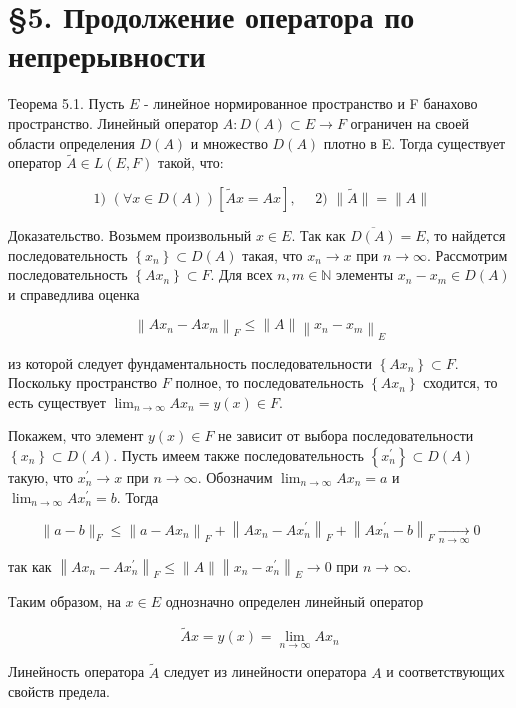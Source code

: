 \section*{§5. Продолжение оператора по непрерывности}
Теорема 5.1. Пусть $E$ - линейное нормированное пространство и F банахово пространство. Линейный оператор $A: D(A) \subset E \rightarrow F$ ограничен на своей области определения $D(A)$ и множество $D(A)$ плотно в E. Тогда существует оператор $\widetilde{A} \in L(E, F)$ такой, что:

$$
\text { 1) }(\forall x \in D(A))[\widetilde{A} x=A x], \quad \text { 2) }\|\widetilde{A}\|=\|A\|
$$

Доказательство. Возьмем произвольный $x \in E$. Так как $\overline{D(A)}=E$, то найдется последовательность $\left\{x_{n}\right\} \subset D(A)$ такая, что $x_{n} \rightarrow x$ при $n \rightarrow \infty$. Рассмотрим последовательность $\left\{A x_{n}\right\} \subset F$. Для всех $n, m \in \mathbb{N}$ элементы $x_{n}-x_{m} \in D(A)$ и справедлива оценка

$$
\left\|A x_{n}-A x_{m}\right\|_{F} \leq\|A\|\left\|x_{n}-x_{m}\right\|_{E}
$$

из которой следует фундаментальность последовательности $\left\{A x_{n}\right\} \subset F$. Поскольку пространство $F$ полное, то последовательность $\left\{A x_{n}\right\}$ сходится, то есть существует $\lim _{n \rightarrow \infty} A x_{n}=y(x) \in F$.

Покажем, что элемент $y(x) \in F$ не зависит от выбора последовательности $\left\{x_{n}\right\} \subset D(A)$. Пусть имеем также последовательность $\left\{x_{n}^{\prime}\right\} \subset D(A)$ такую, что $x_{n}^{\prime} \rightarrow x$ при $n \rightarrow \infty$. Обозначим $\lim _{n \rightarrow \infty} A x_{n}=a$ и $\lim _{n \rightarrow \infty} A x_{n}^{\prime}=b$. Тогда

$$
\|a-b\|_{F} \leq\left\|a-A x_{n}\right\|_{F}+\left\|A x_{n}-A x_{n}^{\prime}\right\|_{F}+\left\|A x_{n}^{\prime}-b\right\|_{F} \underset{n \rightarrow \infty}{\longrightarrow} 0
$$

так как $\left\|A x_{n}-A x_{n}^{\prime}\right\|_{F} \leq\|A\|\left\|x_{n}-x_{n}^{\prime}\right\|_{E} \rightarrow 0$ при $n \rightarrow \infty$.

Таким образом, на $x \in E$ однозначно определен линейный оператор

$$
\widetilde{A} x=y(x)=\lim _{n \rightarrow \infty} A x_{n}
$$

Линейность оператора $\widetilde{A}$ следует из линейности оператора $A$ и соответствующих свойств предела.

